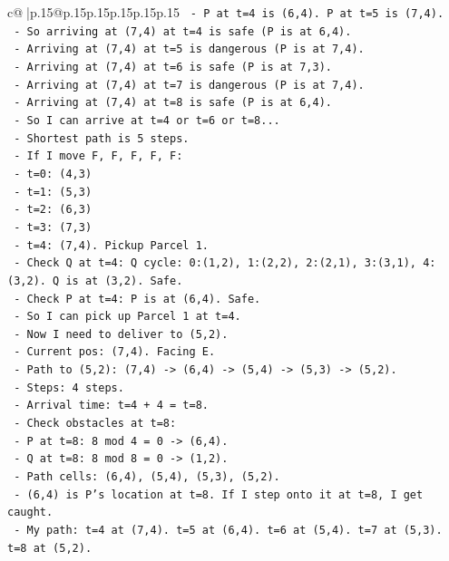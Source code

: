 \documentclass{article}
\begin{document}
{\begin{supertabular}{c@{$\;$}|p{.15\linewidth}@{}p{.15\linewidth}p{.15\linewidth}p{.15\linewidth}p{.15\linewidth}p{.15\linewidth}}
{{{\texttt{  {-} P at t=4 is (6,4). P at t=5 is (7,4).} \\
\texttt{  {-} So arriving at (7,4) at t=4 is safe (P is at 6,4).} \\
\texttt{  {-} Arriving at (7,4) at t=5 is dangerous (P is at 7,4).} \\
\texttt{  {-} Arriving at (7,4) at t=6 is safe (P is at 7,3).} \\
\texttt{  {-} Arriving at (7,4) at t=7 is dangerous (P is at 7,4).} \\
\texttt{  {-} Arriving at (7,4) at t=8 is safe (P is at 6,4).} \\
\texttt{  {-} So I can arrive at t=4 or t=6 or t=8...} \\
\texttt{  {-} Shortest path is 5 steps.} \\
\texttt{  {-} If I move F, F, F, F, F:} \\
\texttt{    {-} t=0: (4,3)} \\
\texttt{    {-} t=1: (5,3)} \\
\texttt{    {-} t=2: (6,3)} \\
\texttt{    {-} t=3: (7,3)} \\
\texttt{    {-} t=4: (7,4). Pickup Parcel 1.} \\
\texttt{    {-} Check Q at t=4: Q cycle: 0:(1,2), 1:(2,2), 2:(2,1), 3:(3,1), 4:(3,2). Q is at (3,2). Safe.} \\
\texttt{    {-} Check P at t=4: P is at (6,4). Safe.} \\
\texttt{  {-} So I can pick up Parcel 1 at t=4.} \\
\texttt{  {-} Now I need to deliver to (5,2).} \\
\texttt{  {-} Current pos: (7,4). Facing E.} \\
\texttt{  {-} Path to (5,2): (7,4) {-}> (6,4) {-}> (5,4) {-}> (5,3) {-}> (5,2).} \\
\texttt{  {-} Steps: 4 steps.} \\
\texttt{  {-} Arrival time: t=4 + 4 = t=8.} \\
\texttt{  {-} Check obstacles at t=8:} \\
\texttt{    {-} P at t=8: 8 mod 4 = 0 {-}> (6,4).} \\
\texttt{    {-} Q at t=8: 8 mod 8 = 0 {-}> (1,2).} \\
\texttt{    {-} Path cells: (6,4), (5,4), (5,3), (5,2).} \\
\texttt{    {-} (6,4) is P's location at t=8. If I step onto it at t=8, I get caught.} \\
\texttt{    {-} My path: t=4 at (7,4). t=5 at (6,4). t=6 at (5,4). t=7 at (5,3). t=8 at (5,2).} \\
}}}
\end{supertabular}}
\end{document}

